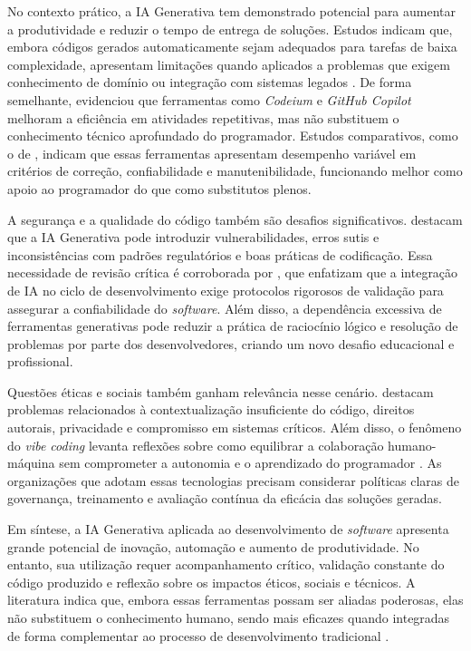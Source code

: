 \documentclass[english,brazilian]{UNISINOSartigo} %
\begin{document}
No contexto prático, a IA Generativa tem demonstrado potencial para aumentar a produtividade e reduzir o tempo de entrega de soluções. Estudos indicam que, embora códigos gerados automaticamente sejam adequados para tarefas de baixa complexidade, apresentam limitações quando aplicados a problemas que exigem conhecimento de domínio ou integração com sistemas legados \cite{liu2024}. De forma semelhante,  evidenciou que ferramentas como \textit{Codeium} e \textit{GitHub Copilot} melhoram a eficiência em atividades repetitivas, mas não substituem o conhecimento técnico aprofundado do programador. Estudos comparativos, como o de , indicam que essas ferramentas apresentam desempenho variável em critérios de correção, confiabilidade e manutenibilidade, funcionando melhor como apoio ao programador do que como substitutos plenos.

A segurança e a qualidade do código também são desafios significativos.  destacam que a IA Generativa pode introduzir vulnerabilidades, erros sutis e inconsistências com padrões regulatórios e boas práticas de codificação. Essa necessidade de revisão crítica é corroborada por , que enfatizam que a integração de IA no ciclo de desenvolvimento exige protocolos rigorosos de validação para assegurar a confiabilidade do \textit{software}. Além disso, a dependência excessiva de ferramentas generativas pode reduzir a prática de raciocínio lógico e resolução de problemas por parte dos desenvolvedores, criando um novo desafio educacional e profissional.

Questões éticas e sociais também ganham relevância nesse cenário.  destacam problemas relacionados à contextualização insuficiente do código, direitos autorais, privacidade e compromisso em sistemas críticos. Além disso, o fenômeno do \textit{vibe coding} levanta reflexões sobre como equilibrar a colaboração humano-máquina sem comprometer a autonomia e o aprendizado do programador \cite{song2025}. As organizações que adotam essas tecnologias precisam considerar políticas claras de governança, treinamento e avaliação contínua da eficácia das soluções geradas.

Em síntese, a IA Generativa aplicada ao desenvolvimento de \textit{software} apresenta grande potencial de inovação, automação e aumento de produtividade. No entanto, sua utilização requer acompanhamento crítico, validação constante do código produzido e reflexão sobre os impactos éticos, sociais e técnicos. A literatura indica que, embora essas ferramentas possam ser aliadas poderosas, elas não substituem o conhecimento humano, sendo mais eficazes quando integradas de forma complementar ao processo de desenvolvimento tradicional \cite{deniz2023, yu2025}.
\end{document}
